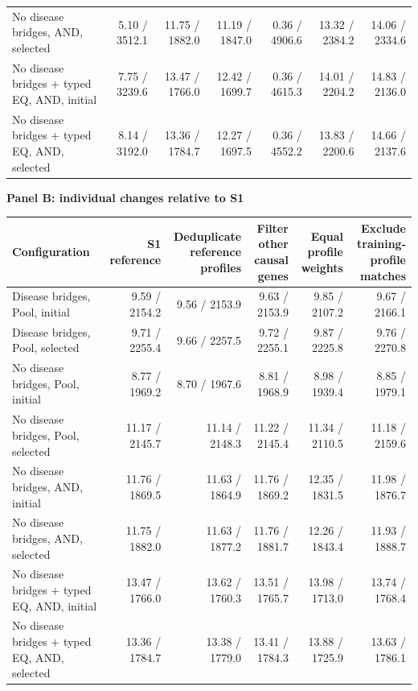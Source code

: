 \begin{landscape}
\begin{table}[p]
\begin{adjustbox}{max width=\linewidth}
\begin{tabular}{lrrrrrr}
No disease bridges, AND, selected & 5.10 / 3512.1 & 11.75 / 1882.0 & 11.19 / 1847.0 & 0.36 / 4906.6 & 13.32 / 2384.2 & 14.06 / 2334.6 \\
No disease bridges + typed EQ, AND, initial & 7.75 / 3239.6 & 13.47 / 1766.0 & 12.42 / 1699.7 & 0.36 / 4615.3 & 14.01 / 2204.2 & 14.83 / 2136.0 \\
No disease bridges + typed EQ, AND, selected & 8.14 / 3192.0 & 13.36 / 1784.7 & 12.27 / 1697.5 & 0.36 / 4552.2 & 13.83 / 2200.6 & 14.66 / 2137.6 \\
\bottomrule
\end{tabular}
\end{adjustbox}
\par\medskip
\textbf{Panel B: individual changes relative to S1}\par\smallskip
\begin{adjustbox}{max width=\linewidth}
\begin{tabular}{lrrrrr}
\toprule
Configuration & S1 reference & \shortstack{Deduplicate\\reference profiles} & \shortstack{Filter other\\causal genes} & \shortstack{Equal profile\\weights} & \shortstack{Exclude training-\\profile matches} \\
\midrule
Disease bridges, Pool, initial & 9.59 / 2154.2 & 9.56 / 2153.9 & 9.63 / 2153.9 & 9.85 / 2107.2 & 9.67 / 2166.1 \\
Disease bridges, Pool, selected & 9.71 / 2255.4 & 9.66 / 2257.5 & 9.72 / 2255.1 & 9.87 / 2225.8 & 9.76 / 2270.8 \\
No disease bridges, Pool, initial & 8.77 / 1969.2 & 8.70 / 1967.6 & 8.81 / 1968.9 & 8.98 / 1939.4 & 8.85 / 1979.1 \\
No disease bridges, Pool, selected & 11.17 / 2145.7 & 11.14 / 2148.3 & 11.22 / 2145.4 & 11.34 / 2110.5 & 11.18 / 2159.6 \\
No disease bridges, AND, initial & 11.76 / 1869.5 & 11.63 / 1864.9 & 11.76 / 1869.2 & 12.35 / 1831.5 & 11.98 / 1876.7 \\
No disease bridges, AND, selected & 11.75 / 1882.0 & 11.63 / 1877.2 & 11.76 / 1881.7 & 12.26 / 1843.4 & 11.93 / 1888.7 \\
No disease bridges + typed EQ, AND, initial & 13.47 / 1766.0 & 13.62 / 1760.3 & 13.51 / 1765.7 & 13.98 / 1713.0 & 13.74 / 1768.4 \\
No disease bridges + typed EQ, AND, selected & 13.36 / 1784.7 & 13.38 / 1779.0 & 13.41 / 1784.3 & 13.88 / 1725.9 & 13.63 / 1786.1 \\
\bottomrule
\end{tabular}
\end{adjustbox}
\end{table}
\clearpage
\end{landscape}
